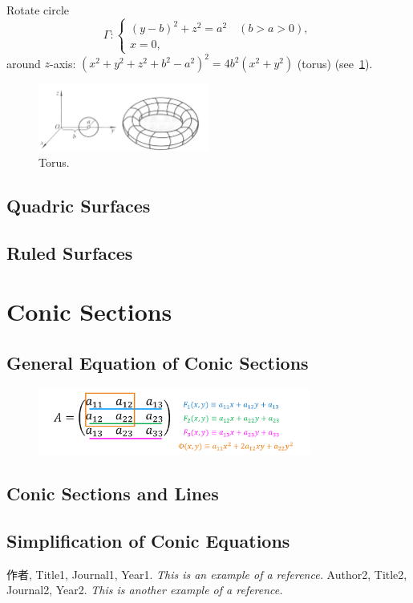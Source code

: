 \documentclass[11pt]{../../TexTemplate/elegantbook} %
\begin{document}
\noindent Rotate circle
\[
\Gamma: \begin{cases} (y-b)^{2}+z^{2}=a^{2}\quad (b>a>0), \\ x = 0, \end{cases}
\]
around \(z\)-axis: \((x^{2}+y^{2}+z^{2}+b^{2}-a^{2})^{2}=4b^{2}(x^{2}+y^{2})\) (torus)
(see~\ref{fig:torus}).
\begin{figure}[h]
    \centering
    \includegraphics[width=0.5\textwidth]{img/circle.png}
    \caption{Torus.}
    \label{fig:torus}
\end{figure}



\section{Quadric Surfaces}

\section{Ruled Surfaces}

\chapter{Conic Sections}
\section{General Equation of Conic Sections}

\begin{figure}[h]
    \centering
    \includegraphics[width=0.8\textwidth]{img/ConicRelation.png}
\end{figure}

\section{Conic Sections and Lines}

\section{Simplification of Conic Equations}




\begin{thebibliography}{99} 
 作者, Title1, Journal1, Year1. \emph{ This is an example of a reference.}
 Author2, Title2, Journal2, Year2. \emph{ This is another example of a reference.}
\end{thebibliography}
\end{document}
